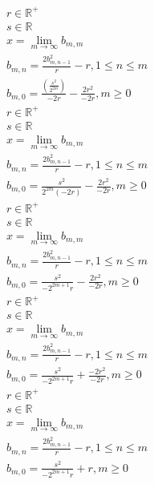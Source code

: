 \documentclass[a4paper,12pt]{report}
\begin{document}
\begin{subequations}
\begin{gather}
r \in \mathbb{R}^+ \\
s \in \mathbb{R} \\
x = \lim \limits_{m \to \infty} b_{m,m} \\
b_{m,n} = \frac{2b_{m,n-1}^2}{r} - r, 1 \leq n \leq m \\
b_{m,0} = \frac{\left(\frac{s^2}{2^{2m}}\right)}{-2r} - \frac{2r^2}{-2r}, m \geq 0
\end{gather}
\end{subequations}
\begin{subequations}
\begin{gather}
r \in \mathbb{R}^+ \\
s \in \mathbb{R} \\
x = \lim \limits_{m \to \infty} b_{m,m} \\
b_{m,n} = \frac{2b_{m,n-1}^2}{r} - r, 1 \leq n \leq m \\
b_{m,0} = \frac{s^2}{2^{2m}(-2r)} - \frac{2r^2}{-2r}, m \geq 0
\end{gather}
\end{subequations}
\begin{subequations}
\begin{gather}
r \in \mathbb{R}^+ \\
s \in \mathbb{R} \\
x = \lim \limits_{m \to \infty} b_{m,m} \\
b_{m,n} = \frac{2b_{m,n-1}^2}{r} - r, 1 \leq n \leq m \\
b_{m,0} = \frac{s^2}{-2^{2m+1}r} - \frac{2r^2}{-2r}, m \geq 0
\end{gather}
\end{subequations}
\begin{subequations}
\begin{gather}
r \in \mathbb{R}^+ \\
s \in \mathbb{R} \\
x = \lim \limits_{m \to \infty} b_{m,m} \\
b_{m,n} = \frac{2b_{m,n-1}^2}{r} - r, 1 \leq n \leq m \\
b_{m,0} = \frac{s^2}{-2^{2m+1}r} + \frac{-2r^2}{-2r}, m \geq 0
\end{gather}
\end{subequations}
\begin{subequations}
\begin{gather}
r \in \mathbb{R}^+ \\
s \in \mathbb{R} \\
x = \lim \limits_{m \to \infty} b_{m,m} \\
b_{m,n} = \frac{2b_{m,n-1}^2}{r} - r, 1 \leq n \leq m \\
b_{m,0} = \frac{s^2}{-2^{2m+1}r} + r, m \geq 0
\end{gather}
\end{subequations}
\end{document}

